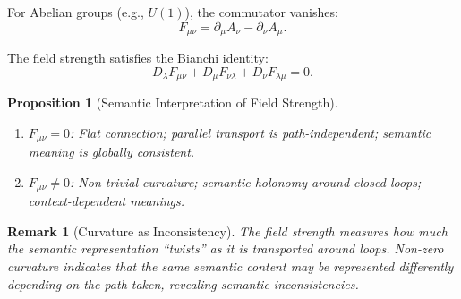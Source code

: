 \documentclass[12pt,letterpaper,twoside]{article}
\newtheorem{remarque}{Remark}[section]
\newtheorem{prop}{Proposition}[section]
\begin{document}
For Abelian groups (e.g., $U(1)$), the commutator vanishes:
\[
F_{\mu\nu} = \partial_\mu A_\nu - \partial_\nu A_\mu.
\]

The field strength satisfies the Bianchi identity:
\[
D_\lambda F_{\mu\nu} + D_\mu F_{\nu\lambda} + D_\nu F_{\lambda\mu} = 0.
\]

\begin{prop}[Semantic Interpretation of Field Strength]
\begin{enumerate}
\item $F_{\mu\nu} = 0$: Flat connection; parallel transport is path-independent; semantic meaning is globally consistent.
\item $F_{\mu\nu} \neq 0$: Non-trivial curvature; semantic holonomy around closed loops; context-dependent meanings.
\end{enumerate}
\end{prop}

\begin{remarque}[Curvature as Inconsistency]
The field strength measures how much the semantic representation ``twists'' as it is transported around loops. Non-zero curvature indicates that the same semantic content may be represented differently depending on the path taken, revealing semantic inconsistencies.
\end{remarque}
\end{document}
